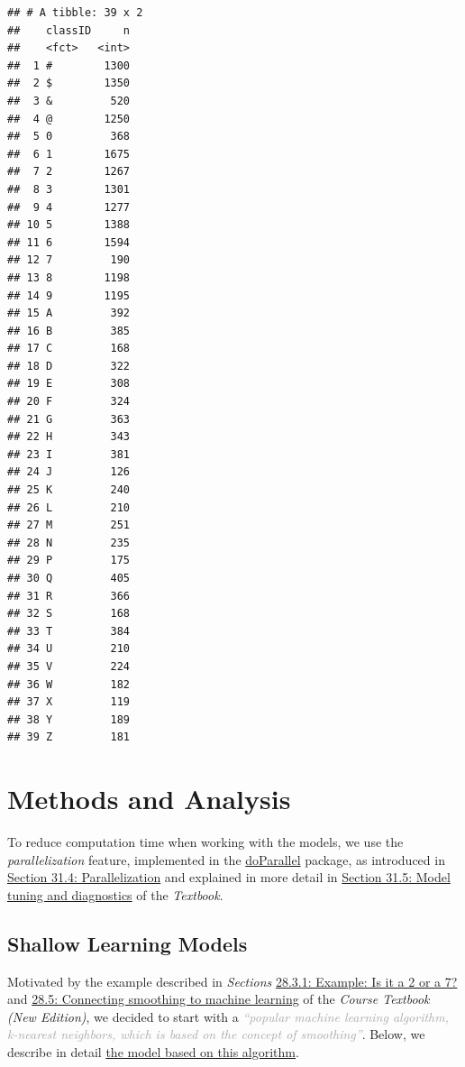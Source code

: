 \documentclass[
]{report}
\begin{document}
\footnotesize

\begin{verbatim}
## # A tibble: 39 x 2
##    classID     n
##    <fct>   <int>
##  1 #        1300
##  2 $        1350
##  3 &         520
##  4 @        1250
##  5 0         368
##  6 1        1675
##  7 2        1267
##  8 3        1301
##  9 4        1277
## 10 5        1388
## 11 6        1594
## 12 7         190
## 13 8        1198
## 14 9        1195
## 15 A         392
## 16 B         385
## 17 C         168
## 18 D         322
## 19 E         308
## 20 F         324
## 21 G         363
## 22 H         343
## 23 I         381
## 24 J         126
## 25 K         240
## 26 L         210
## 27 M         251
## 28 N         235
## 29 P         175
## 30 Q         405
## 31 R         366
## 32 S         168
## 33 T         384
## 34 U         210
## 35 V         224
## 36 W         182
## 37 X         119
## 38 Y         189
## 39 Z         181
\end{verbatim}

\normalsize

\chapter{Methods and Analysis}\label{chapter_MA}

\begin{noteblock}
To reduce computation time when working with the models, we use the \emph{parallelization} feature, implemented in the \href{https://cran.r-project.org/web/packages/doParallel/index.html}{doParallel} package, as introduced in \href{https://rafalab.dfci.harvard.edu/dsbook-part-2/ml/ml-in-practice.html\#parallelization}{Section 31.4: Parallelization} and explained in more detail in \href{https://rafalab.dfci.harvard.edu/dsbook-part-2/ml/ml-in-practice.html\#sec-knn-in-practice}{Section 31.5: Model tuning and diagnostics} of the \emph{Textbook}\autocite{IDS2_31.4,IDS2_31.5}.

\end{noteblock}

\section{Shallow Learning Models}\label{shallow-learning-models}

Motivated by the example described in \emph{Sections} \href{https://rafalab.dfci.harvard.edu/dsbook-part-2/ml/conditionals-and-smoothing.html\#sec-two-or-seven}{28.3.1: Example: Is it a 2 or a 7?} and \href{https://rafalab.dfci.harvard.edu/dsbook-part-2/ml/conditionals-and-smoothing.html\#sec-smoothing-ml-connection}{28.5: Connecting smoothing to machine learning} of the \emph{Course Textbook (New Edition)}, we decided to start with a \textcolor{darkgray}{\textit{``popular machine learning algorithm, k-nearest neighbors, which is based on the concept of smoothing''}}\autocite{IDS2_28.5}. Below, we describe in detail \hyperref[knn_pca_model]{the model based on this algorithm}.
\end{document}
